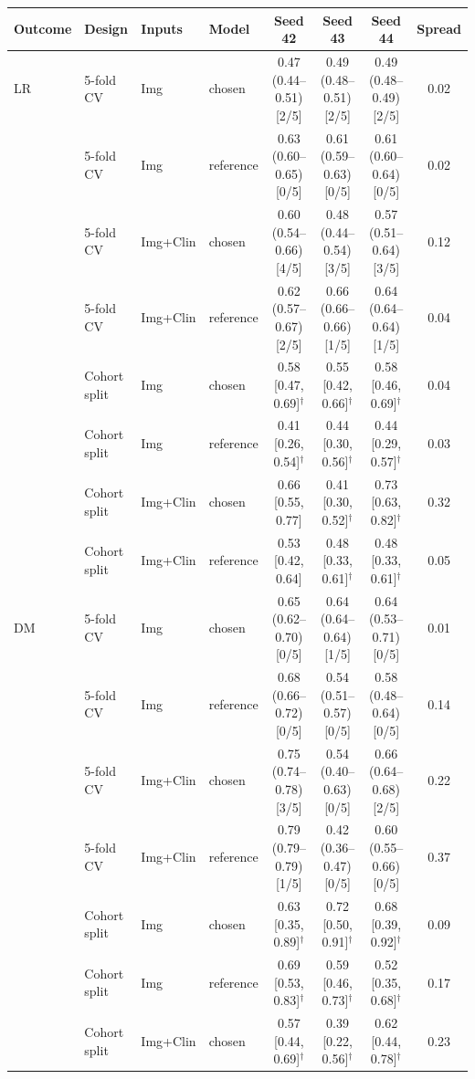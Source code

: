 \begin{tabular}{@{}llllcccc@{}}
\toprule
Outcome & Design & Inputs & Model & Seed 42 & Seed 43 & Seed 44 & Spread \\
\midrule
LR & 5-fold CV & Img & chosen & 0.47 (0.44--0.51) [2/5] & 0.49 (0.48--0.51) [2/5] & 0.49 (0.48--0.49) [2/5] & 0.02 \\
 & 5-fold CV & Img & reference & 0.63 (0.60--0.65) [0/5] & 0.61 (0.59--0.63) [0/5] & 0.61 (0.60--0.64) [0/5] & 0.02 \\
 & 5-fold CV & Img+Clin & chosen & 0.60 (0.54--0.66) [4/5] & 0.48 (0.44--0.54) [3/5] & 0.57 (0.51--0.64) [3/5] & 0.12 \\
 & 5-fold CV & Img+Clin & reference & 0.62 (0.57--0.67) [2/5] & 0.66 (0.66--0.66) [1/5] & 0.64 (0.64--0.64) [1/5] & 0.04 \\
 & Cohort split & Img & chosen & 0.58 [0.47, 0.69]$^{\dagger}$ & 0.55 [0.42, 0.66]$^{\dagger}$ & 0.58 [0.46, 0.69]$^{\dagger}$ & 0.04 \\
 & Cohort split & Img & reference & 0.41 [0.26, 0.54]$^{\dagger}$ & 0.44 [0.30, 0.56]$^{\dagger}$ & 0.44 [0.29, 0.57]$^{\dagger}$ & 0.03 \\
 & Cohort split & Img+Clin & chosen & 0.66 [0.55, 0.77] & 0.41 [0.30, 0.52]$^{\dagger}$ & 0.73 [0.63, 0.82]$^{\dagger}$ & 0.32 \\
 & Cohort split & Img+Clin & reference & 0.53 [0.42, 0.64] & 0.48 [0.33, 0.61]$^{\dagger}$ & 0.48 [0.33, 0.61]$^{\dagger}$ & 0.05 \\
\midrule
DM & 5-fold CV & Img & chosen & 0.65 (0.62--0.70) [0/5] & 0.64 (0.64--0.64) [1/5] & 0.64 (0.53--0.71) [0/5] & 0.01 \\
 & 5-fold CV & Img & reference & 0.68 (0.66--0.72) [0/5] & 0.54 (0.51--0.57) [0/5] & 0.58 (0.48--0.64) [0/5] & 0.14 \\
 & 5-fold CV & Img+Clin & chosen & 0.75 (0.74--0.78) [3/5] & 0.54 (0.40--0.63) [0/5] & 0.66 (0.64--0.68) [2/5] & 0.22 \\
 & 5-fold CV & Img+Clin & reference & 0.79 (0.79--0.79) [1/5] & 0.42 (0.36--0.47) [0/5] & 0.60 (0.55--0.66) [0/5] & 0.37 \\
 & Cohort split & Img & chosen & 0.63 [0.35, 0.89]$^{\dagger}$ & 0.72 [0.50, 0.91]$^{\dagger}$ & 0.68 [0.39, 0.92]$^{\dagger}$ & 0.09 \\
 & Cohort split & Img & reference & 0.69 [0.53, 0.83]$^{\dagger}$ & 0.59 [0.46, 0.73]$^{\dagger}$ & 0.52 [0.35, 0.68]$^{\dagger}$ & 0.17 \\
 & Cohort split & Img+Clin & chosen & 0.57 [0.44, 0.69]$^{\dagger}$ & 0.39 [0.22, 0.56]$^{\dagger}$ & 0.62 [0.44, 0.78]$^{\dagger}$ & 0.23 \\

\end{tabular}
